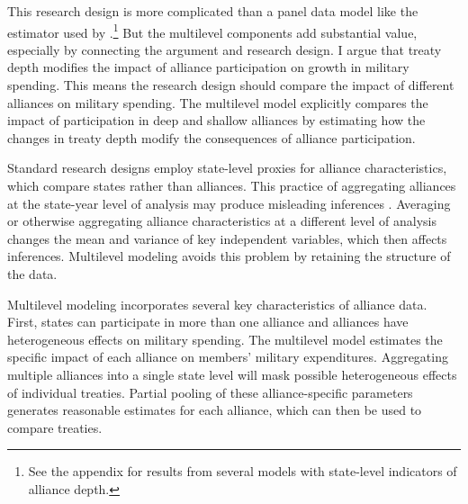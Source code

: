 \documentclass[12pt]{article}
\begin{document}
This research design is more complicated than a panel data model like the estimator used by \citet{DigiuseppePoast2016}.\footnote{See the appendix for results from several models with state-level indicators of alliance depth.}
But the multilevel components add substantial value, especially by connecting the argument and research design.
I argue that treaty depth modifies the impact of alliance participation on growth in military spending. 
This means the research design should compare the impact of different alliances on military spending. 
The multilevel model explicitly compares the impact of participation in deep and shallow alliances by estimating how the changes in treaty depth modify the consequences of alliance participation. 


Standard research designs employ state-level proxies for alliance characteristics, which compare states rather than alliances.
This practice of aggregating alliances at the state-year level of analysis may produce misleading inferences \citep[pg. 356]{McElreath2016}.
Averaging or otherwise aggregating alliance characteristics at a different level of analysis changes the mean and variance of key independent variables, which then affects inferences. 
Multilevel modeling avoids this problem by retaining the structure of the data. 


Multilevel modeling incorporates several key characteristics of alliance data. 
First, states can participate in more than one alliance and alliances have heterogeneous effects on military spending.
The multilevel model estimates the specific impact of each alliance on members' military expenditures. 
Aggregating multiple alliances into a single state level will mask possible heterogeneous effects of individual treaties. 
Partial pooling of these alliance-specific parameters generates reasonable estimates for each alliance, which can then be used to compare treaties. 
\end{document}
